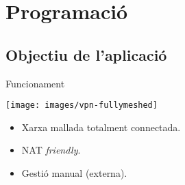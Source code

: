 \section{Programació}
\subsection{Objectiu de l'aplicació}
    \begin{frame}{Funcionament}
        \begin{center}
        \texttt{[image: images/vpn-fullymeshed]}
        \end{center}
        \begin{itemize}
\item Xarxa mallada totalment connectada.
\item NAT \emph{friendly}.
\item Gestió manual (externa).
        \end{itemize}
    \end{frame}

